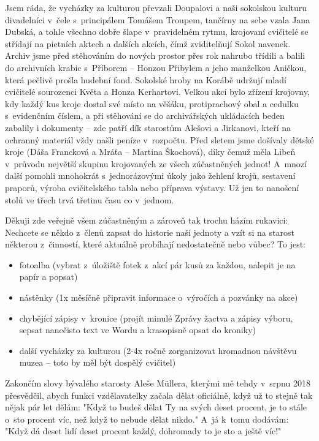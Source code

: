\documentclass[11pt]{article}
\begin{document}
Jsem ráda, že vycházky za kulturou převzali Doupalovi a naši sokolskou kulturu divadelníci v~čele s~principálem Tomášem Troupem, tančírny na sebe vzala Jana Dubská, a tohle všechno dobře šlape v~pravidelném rytmu, krojovaní cvičitelé se střídají na pietních aktech a dalších akcích, čímž zviditelňují Sokol navenek.
Archiv jsme před stěhováním do nových prostor přes rok nahrubo třídili a balili do archivních krabic s~Příborem – Honzou Přibylem a jeho manželkou Aničkou, která pečlivě prošla hudební fond. Sokolské hroby na Korábě udržují mladí cvičitelé sourozenci Květa a Honza Kerhartovi. Velkou akcí bylo zřízení krojovny, kdy každý kus kroje dostal své místo na věšáku, protiprachový obal a cedulku s~evidenčním číslem, a při stěhování se do archivářských ukládacích beden zabalily i dokumenty – zde patří dík starostům Alešovi a Jirkanovi, kteří na ochranný materiál vždy našli peníze v~rozpočtu. Před sletem jsme došívaly dětské kroje (Dáša Francková a Mráťa – Martina Škochová), díky čemuž měla Libeň v~průvodu největší skupinu krojovaných ze všech zúčastněných jednot! A~mnozí další pomohli mnohokrát s~jednorázovými úkoly jako žehlení krojů, sestavení praporů, výroba cvičitelského tabla nebo příprava výstavy. Už jen to nanošení stolů ve třech trvá třetinu času co v~jednom.

Děkuji zde veřejně všem zúčastněným a zároveň tak trochu házím rukavici: Nechcete se někdo z~členů zapsat do historie naší jednoty a vzít si na starost některou z~činností, které aktuálně probíhají nedostatečně nebo vůbec? To jest:
\begin{itemize}
  \item fotoalba (vybrat z~úložiště fotek z~akcí pár kusů za každou, nalepit je na papír a popsat)
  \item nástěnky (1x měsíčně připravit informace o~výročích a pozvánky na akce) 
  \item chybějící zápisy v~kronice (projít minulé Zprávy žactva a zápisy výboru, sepsat nanečisto text ve Wordu a krasopisně opsat do kroniky)
  \item další vycházky za kulturou (2-4x ročně zorganizovat hromadnou návštěvu muzea – toto by měl být dospělý cvičitel)
\end{itemize}

Zakončím slovy bývalého starosty Aleše Müllera, kterými mě tehdy v~srpnu 2018 přesvědčil, abych funkci vzdělavatelky začala dělat oficiálně, když už to stejně tak nějak pár let dělám: "Když to budeš dělat Ty na svých deset procent, je to stále o~sto procent víc, než když to nebude dělat nikdo." A~já k~tomu dodávám: "Když dá deset lidí deset procent každý, dohromady to je sto a ještě víc!"
\end{document}
